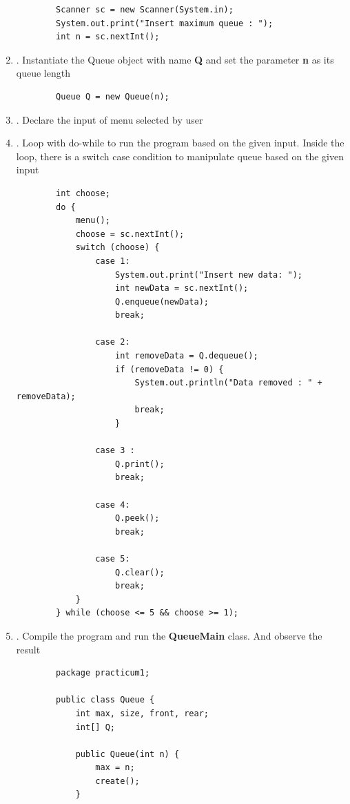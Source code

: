 \documentclass[12pt,titlepage]{article}
\begin{document}
\begin{enumerate}
    \begin{verbatim}
        Scanner sc = new Scanner(System.in);
        System.out.print("Insert maximum queue : ");
        int n = sc.nextInt();
    \end{verbatim}
    \item. Instantiate the Queue object with name \textbf{Q} and set the parameter \textbf{n} as its queue length
    \begin{verbatim}
        Queue Q = new Queue(n);
    \end{verbatim}
    \item. Declare the input of menu selected by user
    \item. Loop with do-while to run the program based on the given input. Inside the loop, there is a switch case condition to manipulate queue based on the given input
    \begin{verbatim}
        int choose;
        do {
            menu();
            choose = sc.nextInt();
            switch (choose) {
                case 1:
                    System.out.print("Insert new data: ");
                    int newData = sc.nextInt();
                    Q.enqueue(newData);
                    break;
                
                case 2:
                    int removeData = Q.dequeue();
                    if (removeData != 0) {
                        System.out.println("Data removed : " + removeData);
                        break;
                    }
            
                case 3 :
                    Q.print();
                    break;
                
                case 4:
                    Q.peek();
                    break;

                case 5:
                    Q.clear();
                    break;
            }
        } while (choose <= 5 && choose >= 1);
    \end{verbatim}
    \item. Compile the program and run the \textbf{QueueMain} class. And observe the result
    \begin{verbatim}
        package practicum1;

        public class Queue {
            int max, size, front, rear;
            int[] Q;
            
            public Queue(int n) {
                max = n;
                create();
            }


\end{verbatim}
\end{enumerate}
\end{document}
